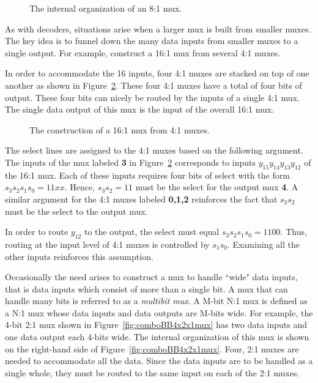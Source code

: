     \begin{figure}[ht]
        \caption{The internal organization of an 8:1 mux.}
        \label{fig:comboBB8:1Guts}
    \end{figure}

    As with decoders, situations arise when a larger
    mux is built from smaller muxes.  The key idea is to funnel down the many data
    inputs from smaller muxes to a single output.  For example, construct
    a 16:1 mux from several 4:1 muxes.

    In order to accommodate the 16 inputs, four 4:1 muxes are stacked
    on top of one another as shown in Figure~\ref{fig:comboBBBigMux}.  These
    four 4:1 muxes have a total of four bits of output.  These four bits
    can nicely be routed by the inputs of a single 4:1 mux.  The
    single data output of this mux is the input of the overall 16:1 mux.

    \begin{figure}[ht]
        \caption{The construction of a 16:1 mux from 4:1 muxes.}
        \label{fig:comboBBBigMux}
    \end{figure}

    The select lines are assigned to the 4:1 muxes based on the following
    argument.  The inputs of the mux labeled \textbf{ 3} in
    Figure~\ref{fig:comboBBBigMux} corresponds to inputs $y_{15} y_{14} y_{13} y_{12}$
    of the 16:1 mux.  Each of these inputs requires four bits of
    select with the form $s_3 s_2 s_1 s_0 = 11xx$.  Hence, $s_3 s_2 = 11$
    must be the select for the output mux \textbf{ 4}.
    A similar argument for the 4:1
    muxes labeled \textbf{ 0,1,2} reinforces the fact that $s_3 s_2$ must be
    the select to the output mux.

    In order to route $y_{12}$ to the output, the select must equal
    $s_3 s_2 s_1 s_0 = 1100$.  Thus, routing at the input level of 4:1
    muxes is controlled by $s_1 s_0$.  Examining all the other
    inputs reinforces this assumption.

    Occasionally the need arises to construct a mux to handle
    ``wide" data inputs, that is data inputs which consist of more than
    a single bit.  A mux that can handle many bits is referred to
    as a \textit{ multibit mux}.  \label{multibit mux} A M-bit N:1 mux is
    defined as a N:1 mux whose data inputs and data outputs are M-bits
    wide.  For example, the 4-bit 2:1 mux shown in Figure~\ref{fig:comboBB4x2x1mux}
    has two data inputs and one data output each 4-bits wide.  The internal
    organization of this mux is shown on the right-hand side of
    Figure~\ref{fig:comboBB4x2x1mux}.  Four, 2:1 muxes are needed to
    accommodate all the data.  Since the data inputs are to
    be handled as a single whole, they must be routed to the
    same input on each of the 2:1 muxes.
    \label{page:wmu}

